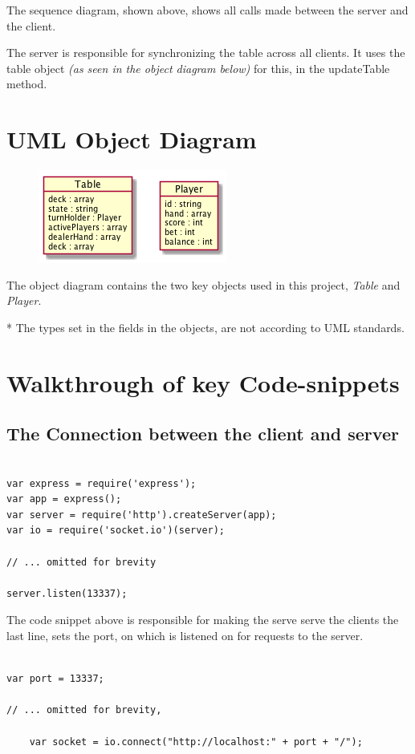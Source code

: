 \documentclass[a4paper]{article}
\begin{document}
The sequence diagram, shown above, shows all calls made between the server and the client.

The server is responsible for synchronizing the table across all clients.
It uses the table object \textit{(as seen in the object diagram below)} for this, in the updateTable method.

\section{UML Object Diagram}
\begin{figure}[hbt]
  \centering
  \includegraphics{ClassDiag}
\end{figure}
The object diagram contains the two key objects used in this project, \textit{Table}
and \textit{Player}.

* The types set in the fields in the objects, are not according to
UML standards.
\section{Walkthrough of key Code-snippets}
\subsection{The Connection between the client and server}
\begin{listing}[H]
\begin{verbatim}

var express = require('express');
var app = express();
var server = require('http').createServer(app);
var io = require('socket.io')(server);

// ... omitted for brevity

server.listen(13337);

\end{verbatim}
\end{listing}
The code snippet above is responsible for making the serve serve the clients
the last line, sets the port, on which is listened on for requests to the server.

\begin{listing}[H]
\begin{verbatim}

var port = 13337;

// ... omitted for brevity,

	var socket = io.connect("http://localhost:" + port + "/");

\end{verbatim}
\end{listing}
\end{document}
